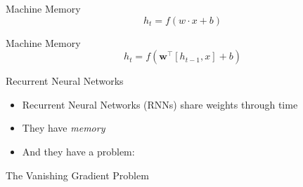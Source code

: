 \begin{slide}{Machine Memory}
  $$h_t = f(w \cdot x + b)$$
\end{slide}

\begin{slide}{Machine Memory}
  $$h_t = f(\mathbf{w}^\top [h_{t-1}, x] + b)$$
\end{slide}

\begin{slide}{Recurrent Neural Networks}
  \begin{itemize}
    \item Recurrent Neural Networks (RNNs) share weights through time
    \item They have \emph{memory}
    \item And they have a problem:
  \end{itemize}
  \vspace{1cm}
  {
    \Large
    The Vanishing Gradient Problem
  }
\end{slide}

